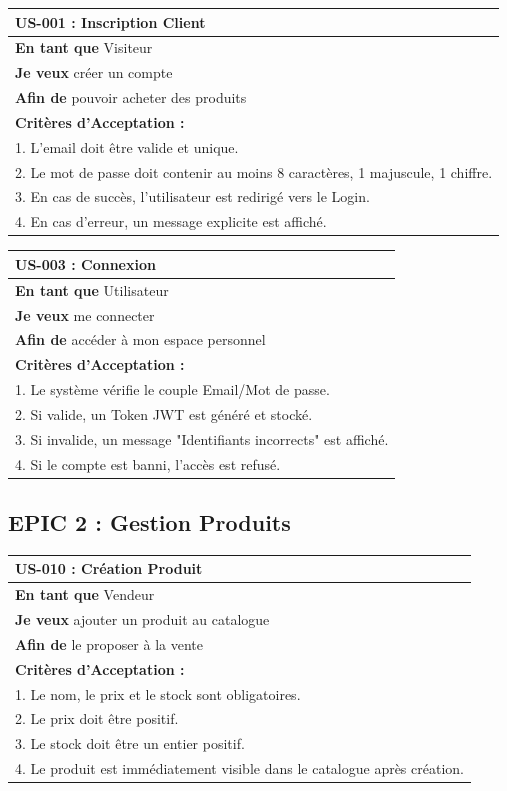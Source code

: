 \documentclass[12pt,a4paper]{article}
\begin{document}
\begin{longtable}{|p{15cm}|}
    \hline
    \textbf{US-001 : Inscription Client} \\ \hline
    \textbf{En tant que} Visiteur \\
    \textbf{Je veux} créer un compte \\
    \textbf{Afin de} pouvoir acheter des produits \\ \hline
    \textbf{Critères d'Acceptation :} \\
    1. L'email doit être valide et unique. \\
    2. Le mot de passe doit contenir au moins 8 caractères, 1 majuscule, 1 chiffre. \\
    3. En cas de succès, l'utilisateur est redirigé vers le Login. \\
    4. En cas d'erreur, un message explicite est affiché. \\ \hline
\end{longtable}

\begin{longtable}{|p{15cm}|}
    \hline
    \textbf{US-003 : Connexion} \\ \hline
    \textbf{En tant que} Utilisateur \\
    \textbf{Je veux} me connecter \\
    \textbf{Afin de} accéder à mon espace personnel \\ \hline
    \textbf{Critères d'Acceptation :} \\
    1. Le système vérifie le couple Email/Mot de passe. \\
    2. Si valide, un Token JWT est généré et stocké. \\
    3. Si invalide, un message "Identifiants incorrects" est affiché. \\
    4. Si le compte est banni, l'accès est refusé. \\ \hline
\end{longtable}

\subsection{EPIC 2 : Gestion Produits}

\begin{longtable}{|p{15cm}|}
    \hline
    \textbf{US-010 : Création Produit} \\ \hline
    \textbf{En tant que} Vendeur \\
    \textbf{Je veux} ajouter un produit au catalogue \\
    \textbf{Afin de} le proposer à la vente \\ \hline
    \textbf{Critères d'Acceptation :} \\
    1. Le nom, le prix et le stock sont obligatoires. \\
    2. Le prix doit être positif. \\
    3. Le stock doit être un entier positif. \\
    4. Le produit est immédiatement visible dans le catalogue après création. \\ \hline
\end{longtable}
\end{document}
